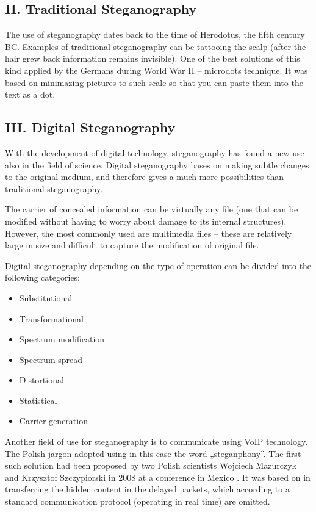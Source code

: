 \documentclass[10pt, a5paper]{article}
\begin{document}
\subsection*{II. Traditional Steganography}

The use of steganography dates back to the time of Herodotus, the fifth century BC. Examples of traditional steganography can be tattooing the scalp (after the hair grew back information remains invisible). One of the best solutions of this kind applied by the Germans during World War II -- microdots technique. It was based on minimazing  pictures to such scale so that you can paste them into the text as a dot.

\subsection*{III. Digital Steganography}

With the development of digital technology, steganography has found a new use also in the field of science. Digital steganography bases on making subtle changes to the original medium, and therefore gives a much more possibilities than traditional steganography.

The carrier of concealed information can be virtually any file (one that can be modified without having to worry about damage to its internal structures). However, the most commonly used are multimedia files -- these are relatively large in size and difficult to capture the modification of original file.

Digital steganography depending on the type of operation can be divided into the following categories:

\begin{itemize}
  \item Substitutional
  \item Transformational
  \item Spectrum modification
  \item Spectrum spread
  \item Distortional
  \item Statistical
  \item Carrier generation
\end{itemize}

Another field of use for steganography is to communicate using VoIP technology. The Polish jargon adopted using in this case the word „steganphony”. The first such solution had been proposed by two Polish scientists Wojciech Mazurczyk and Krzysztof Szczypiorski in 2008 at a conference in Mexico \footnotemark[11]. It was based on in transferring the hidden content in the delayed packets, which according to a standard communication protocol (operating in real time) are omitted.
\end{document}
